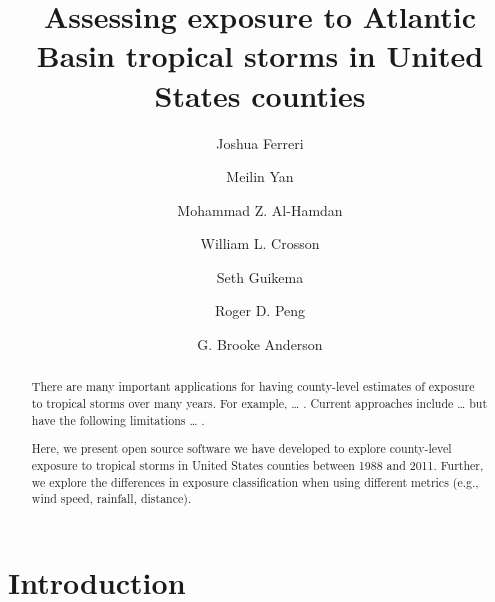 \documentclass[]{elsarticle} %
\begin{document}
\begin{frontmatter}

  \title{Assessing exposure to Atlantic Basin tropical storms in United States
counties}
    \author[Colorado State University]{Joshua Ferreri}
  
    \author[Colorado State University]{Meilin Yan}
  
    \author[NASA Marshall Space Flight Center]{Mohammad Z. Al-Hamdan}
  
    \author[NASA Marshall Space Flight Center]{William L. Crosson}
  
    \author[University of Michigan]{Seth Guikema}
  
    \author[Johns Hopkins Bloomberg School of Public Health]{Roger D. Peng}
  
    \author[Colorado State University]{G. Brooke Anderson}
      \address[Colorado State University]{Department of Environmental and Radiological Health Sciences, Lake
Street, Fort Collins, CO, Zip}
    \address[NASA Marshall Space Flight Center]{Universities Space Research Association, Street, Huntsville, AL, Zip}
    \address[University of Michigan]{Department, Street, City, State, Zip}
    \address[Johns Hopkins Bloomberg School of Public Health]{Department of Biostatistics, Street, Baltimore, MD, Zip}
  
  \begin{abstract}
  There are many important applications for having county-level estimates
  of exposure to tropical storms over many years. For example, \ldots{} .
  Current approaches include \ldots{} but have the following limitations
  \ldots{} .
  
  Here, we present open source software we have developed to explore
  county-level exposure to tropical storms in United States counties
  between 1988 and 2011. Further, we explore the differences in exposure
  classification when using different metrics (e.g., wind speed, rainfall,
  distance).
  \end{abstract}
  
 \end{frontmatter}

\section{Introduction}\label{introduction}
\end{document}
